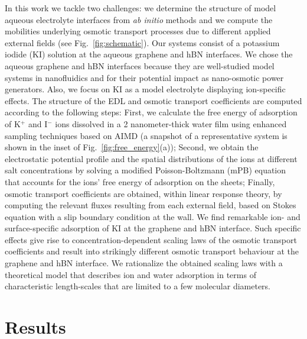 \documentclass[journal=ancac3,manuscript=article,layout=twocolumn]{achemso}
\begin{document}
In this work we tackle two
challenges: we determine the structure of model aqueous
electrolyte interfaces from \textit{ab initio} methods and we compute the
mobilities underlying osmotic transport processes due to different applied external fields
(see Fig.~\ref{fig:schematic}). Our systems consist of a potassium iodide (KI) solution at the
aqueous graphene and  hBN interfaces.
We chose the aqueous graphene and hBN
interfaces because they are well-studied model systems in
nanofluidics and for their potential impact
as nano-osmotic power generators\cite{macha20192d}.
Also, we focus on KI
as a model electrolyte displaying ion-specific
effects\cite{schwierz2010reversed,huang2007ion,baer2011toward}.
The structure of the EDL and osmotic transport coefficients are computed
according to the following steps: First, we calculate the free
energy of adsorption
of K$^+$ and I$^-$ ions dissolved in a 2 nanometer-thick
water film using enhanced sampling
techniques based on AIMD  (a snapshot of a
representative system is shown in the inset of
Fig.~\ref{fig:free_energy}(a)); Second, we obtain the electrostatic potential profile and the
spatial distributions of the ions
at different salt concentrations by solving
a modified Poisson-Boltzmann (mPB) equation that
accounts for the ions' free energy of
adsorption on the sheets;
Finally, osmotic transport coefficients are obtained, within linear response theory,
by computing the relevant fluxes resulting from each external field, based on Stokes equation with a slip boundary condition at the wall.
We find remarkable ion- and surface-specific
adsorption of KI at the graphene and hBN interface. Such specific effects give rise
to concentration-dependent scaling laws of the
osmotic transport coefficients and result into strikingly
different osmotic transport behaviour at the graphene
and hBN interface. We rationalize the obtained scaling laws
with a theoretical model that describes
ion and water adsorption in terms of characteristic
length-scales that are limited to a few molecular diameters.



\section{Results}
\end{document}
